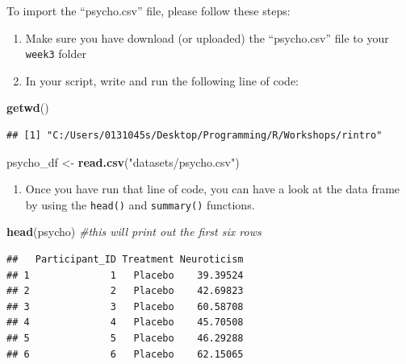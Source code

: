 \documentclass[
]{book}
\newenvironment{Shaded}{\begin{snugshade}}{\end{snugshade}}
\newcommand{\CommentTok}[1]{\textcolor[rgb]{0.56,0.35,0.01}{\textit{#1}}}
\newcommand{\FunctionTok}[1]{\textcolor[rgb]{0.13,0.29,0.53}{\textbf{#1}}}
\newcommand{\NormalTok}[1]{#1}
\newcommand{\OtherTok}[1]{\textcolor[rgb]{0.56,0.35,0.01}{#1}}
\newcommand{\StringTok}[1]{\textcolor[rgb]{0.31,0.60,0.02}{#1}}
\providecommand{\tightlist}{%
  \setlength{\itemsep}{0pt}\setlength{\parskip}{0pt}}
\begin{document}
To import the ``psycho.csv'' file, please follow these steps:

\begin{enumerate}
\def\labelenumi{\arabic{enumi}.}
\item
  Make sure you have download (or uploaded) the ``psycho.csv'' file to your \texttt{week3} folder
\item
  In your script, write and run the following line of code:
\end{enumerate}

\begin{Shaded}
\begin{Highlighting}[]
\FunctionTok{getwd}\NormalTok{()}
\end{Highlighting}
\end{Shaded}

\begin{verbatim}
## [1] "C:/Users/0131045s/Desktop/Programming/R/Workshops/rintro"
\end{verbatim}

\begin{Shaded}
\begin{Highlighting}[]
\NormalTok{psycho\_df }\OtherTok{\textless{}{-}} \FunctionTok{read.csv}\NormalTok{(}\StringTok{"datasets/psycho.csv"}\NormalTok{)}
\end{Highlighting}
\end{Shaded}

\begin{enumerate}
\def\labelenumi{\arabic{enumi}.}
\setcounter{enumi}{2}
\tightlist
\item
  Once you have run that line of code, you can have a look at the data frame by using the \texttt{head()} and \texttt{summary()} functions.
\end{enumerate}

\begin{Shaded}
\begin{Highlighting}[]
\FunctionTok{head}\NormalTok{(psycho) }\CommentTok{\#this will print out the first six rows}
\end{Highlighting}
\end{Shaded}

\begin{verbatim}
##   Participant_ID Treatment Neuroticism
## 1              1   Placebo    39.39524
## 2              2   Placebo    42.69823
## 3              3   Placebo    60.58708
## 4              4   Placebo    45.70508
## 5              5   Placebo    46.29288
## 6              6   Placebo    62.15065
\end{verbatim}
\end{document}
